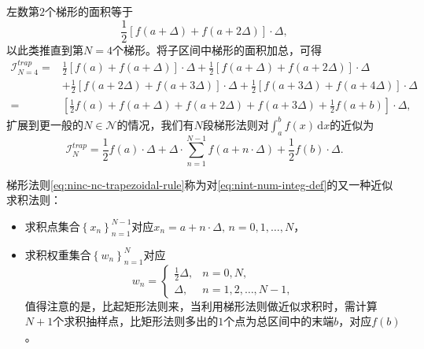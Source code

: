 左数第$2$个梯形的面积等于
\begin{equation*}
  \frac{1}{2} \left[ f \left( a + \Delta \right) + f \left( a + 2 \Delta \right) \right] \cdot \Delta,
\end{equation*}
以此类推直到第$N=4$个梯形。将子区间中梯形的面积加总，可得
\begin{equation*}
\begin{split}
  \mathcal{I}_{N=4}^{trap} = &
    \frac{1}{2} \left[ f \left( a \right) + f \left( a + \Delta \right) \right] \cdot \Delta
    + \frac{1}{2} \left[ f \left( a + \Delta \right) + f \left( a + 2 \Delta \right) \right] \cdot \Delta \\
    & + \frac{1}{2} \left[ f \left( a + 2 \Delta \right) + f \left( a + 3 \Delta \right) \right] \cdot \Delta
    + \frac{1}{2} \left[ f \left( a + 3 \Delta \right) + f \left( a + 4 \Delta \right) \right] \cdot \Delta \\
    = & \left[
    \frac{1}{2} f \left( a \right)
    + f \left( a + \Delta \right)
    + f \left( a + 2 \Delta \right)
    + f \left( a + 3 \Delta \right)
    + \frac{1}{2} f \left( a + b \right)
    \right] \cdot \Delta,
\end{split}
\end{equation*}
扩展到更一般的$N \in \mathcal{N}$的情况，我们有$N$段梯形法则对$\int_{a}^{b} f \left( x \right) \, \mathrm{d} x$的近似为
\begin{equation}
  \label{eq:ninc-nc-trapezoidal-rule}
  \mathcal{I}_{N}^{trap} = \frac{1}{2} f \left( a \right) \cdot \Delta
  + \Delta \cdot \sum_{n=1}^{N-1} f \left( a + n \cdot \Delta \right)
  + \frac{1}{2} f \left( b \right) \cdot \Delta.
\end{equation}


梯形法则\eqref{eq:ninc-nc-trapezoidal-rule}称为对\eqref{eq:nint-num-integ-def}的又一种近似求积法则：
\begin{itemize}
  \item 求积点集合$\left\{ x_{n} \right\}_{n=1}^{N-1}$对应$x_{n} = a + n \cdot \Delta, \, n = 0,1,\ldots,N$，
  \item 求积权重集合$\left\{ w_{n} \right\}_{n=1}^{N}$对应
  \begin{equation*}
  w_{n} =
  \begin{cases}
  \frac{1}{2} \Delta, & n = 0, N, \\
  \Delta, & n = 1, 2, \ldots, N-1,
  \end{cases}
\end{equation*}
值得注意的是，比起矩形法则来，当利用梯形法则做近似求积时，需计算$N+1$个求积抽样点，比矩形法则多出的$1$个点为总区间中的末端$b$，对应$f(b)$。
\end{itemize}

